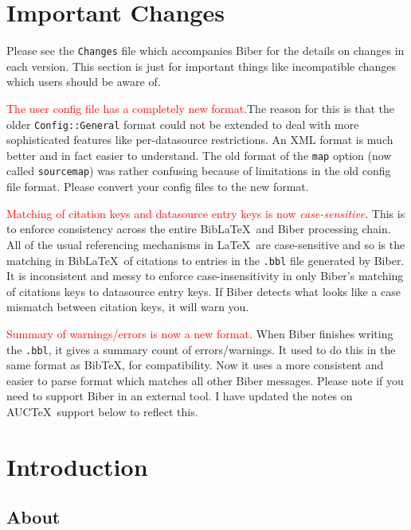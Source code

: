 \documentclass{ltxdockit}
\begin{document}
\printtitlepage
\tableofcontents

\section{Important Changes}\label{special}

Please see the \verb+Changes+ file which accompanies Biber for the
details on changes in each version. This section is just for important
things like incompatible changes which users should be aware of.

\textcolor{red}{The user config file has a completely new format}.The
  reason for this is that the older \verb+Config::General+ format
  could not be extended to deal with more sophisticated features like
  per-datasource restrictions. An XML format is much better and in
  fact easier to understand. The old format of the \verb+map+ option
  (now called \verb+sourcemap+) was rather confusing because
  of limitations in the old config file format. Please convert your
  config files to the new format.

\textcolor{red}{Matching of citation keys and datasource entry
  keys is now \emph{case-sensitive}}. This is to enforce consistency
across the entire Bib\LaTeX\ and Biber processing chain.
All of the usual referencing mechanisms in \LaTeX\ are case-sensitive and
so is the matching in Bib\LaTeX\ of citations to entries in the
\texttt{.bbl} file generated by Biber. It is inconsistent and
messy to enforce case-insensitivity in only Biber's matching of
citations keys to datasource entry keys. If Biber detects what
looks like a case mismatch between citation keys, it will warn you.

\noindent \textcolor{red}{Summary of warnings/errors is now a new format}.
When Biber finishes writing the \verb+.bbl+, it gives a summary
count of errors/warnings. It used to do this in the same format as
Bib\TeX, for compatibility. Now it uses a more consistent and easier
to parse format which matches all other Biber messages. Please note
if you need to support Biber in an external tool. I have updated the
notes on AUC\TeX\ support below to reflect this.

\section{Introduction}\label{int}

\subsection{About}
\end{document}
